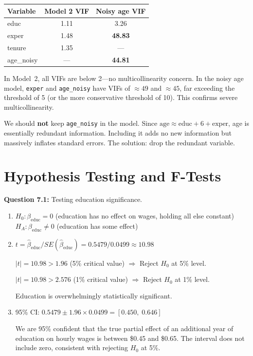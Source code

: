 \documentclass[11pt,letterpaper]{article}
\begin{document}
\begin{answer}
\begin{center}
\begin{tabular}{l|cc}
\toprule
Variable & Model 2 VIF & Noisy age VIF \\
\midrule
educ & 1.11 & 3.26 \\
exper & 1.48 & \textbf{48.83} \\
tenure & 1.35 & --- \\
age\_noisy & --- & \textbf{44.81} \\
\bottomrule
\end{tabular}
\end{center}

In Model~2, all VIFs are below 2---no multicollinearity concern. In the noisy age model, \texttt{exper} and \texttt{age\_noisy} have VIFs of $\approx 49$ and $\approx 45$, far exceeding the threshold of 5 (or the more conservative threshold of 10). This confirms severe multicollinearity.

We should \textbf{not} keep \texttt{age\_noisy} in the model. Since $\text{age} \approx \text{educ} + 6 + \text{exper}$, age is essentially redundant information. Including it adds no new information but massively inflates standard errors. The solution: drop the redundant variable.
\end{answer}

\newpage

\section{Hypothesis Testing and F-Tests}

\textbf{Question 7.1:} Testing education significance.

\begin{answer}
\begin{enumerate}[label=(\alph*)]
\item $H_0: \beta_{\text{educ}} = 0$ (education has no effect on wages, holding all else constant)\\
$H_A: \beta_{\text{educ}} \neq 0$ (education has some effect)

\item $t = \hat{\beta}_{\text{educ}} / SE(\hat{\beta}_{\text{educ}}) = 0.5479 / 0.0499 \approx 10.98$

$|t| = 10.98 > 1.96$ (5\% critical value) $\Rightarrow$ Reject $H_0$ at 5\% level.

$|t| = 10.98 > 2.576$ (1\% critical value) $\Rightarrow$ Reject $H_0$ at 1\% level.

Education is overwhelmingly statistically significant.

\item 95\% CI: $0.5479 \pm 1.96 \times 0.0499 = [0.450,\; 0.646]$

We are 95\% confident that the true partial effect of an additional year of education on hourly wages is between \$0.45 and \$0.65. The interval does not include zero, consistent with rejecting $H_0$ at 5\%.
\end{enumerate}
\end{answer}
\end{document}
